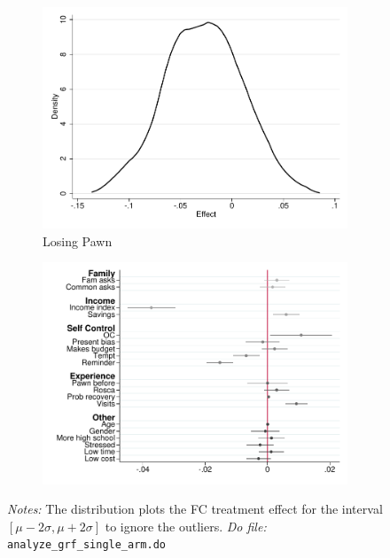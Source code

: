 \documentclass[11pt]{article}
\begin{document}
\begin{figure}[H]
\begin{center}
    \begin{subfigure}{0.4\textwidth}
        \caption{Losing Pawn}
        \centering
        \includegraphics[width=\textwidth]{Figuras/he_dist_def_c_pro_4.pdf}
    \end{subfigure}
    \begin{subfigure}{0.4\textwidth}
        \caption*{}
        \centering
        \includegraphics[width=\textwidth]{Figuras/HE/he_int_vertical_def_c_pro_4.pdf}
    \end{subfigure}
    \end{center}
     \footnotesize \textit{Notes: } The distribution plots the FC treatment effect for the interval $[\mu-2\sigma,\mu+2\sigma]$ to ignore the outliers.
      \footnotesize{ \textit{Do file: }  \texttt{analyze\_grf\_single\_arm.do}}
\end{figure}
\end{document}
